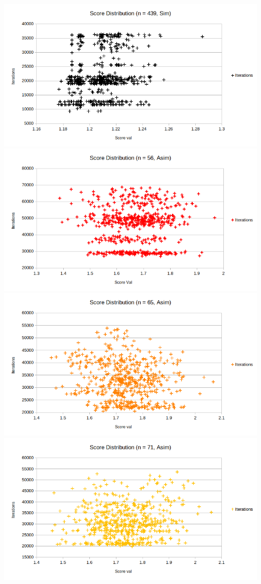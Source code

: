 \documentclass{article}
\begin{document}
\includegraphics[scale=0.36]{simDist439}
\includegraphics[scale=0.36]{asimDist56}
\includegraphics[scale=0.36]{asimDist65}
\includegraphics[scale=0.36]{asimDist71}
\end{document}
